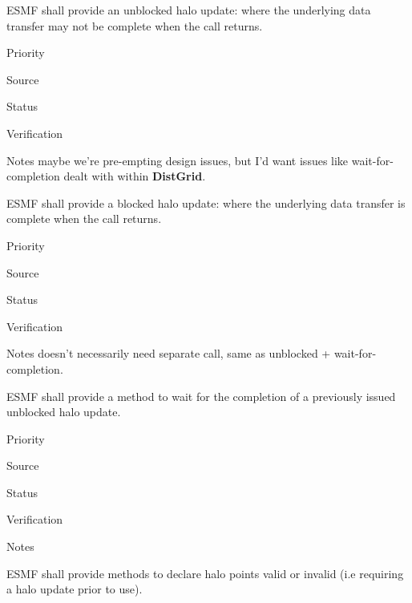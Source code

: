  \label{DG:halo}


ESMF shall provide an unblocked halo update: where the underlying
data transfer may not be complete when the call returns.

\begin{reqlist}
\item[Priority]
\item[Source]
\item[Status]
\item[Verification]
\item[Notes] maybe we're pre-empting design issues, but I'd want
  issues like wait-for-completion dealt with within \textbf{DistGrid}.
\end{reqlist}


ESMF shall provide a blocked halo update: where the underlying
data transfer is complete when the call returns.

\begin{reqlist}
\item[Priority]
\item[Source]
\item[Status]
\item[Verification]
\item[Notes] doesn't necessarily need separate call, same as unblocked
  + wait-for-completion.
\end{reqlist}


ESMF shall provide a method to wait for the completion of a previously
issued unblocked halo update.

\begin{reqlist}
\item[Priority]
\item[Source]
\item[Status]
\item[Verification]
\item[Notes]
\end{reqlist}


ESMF shall provide methods to declare halo points valid or invalid
(i.e requiring a halo update prior to use).

